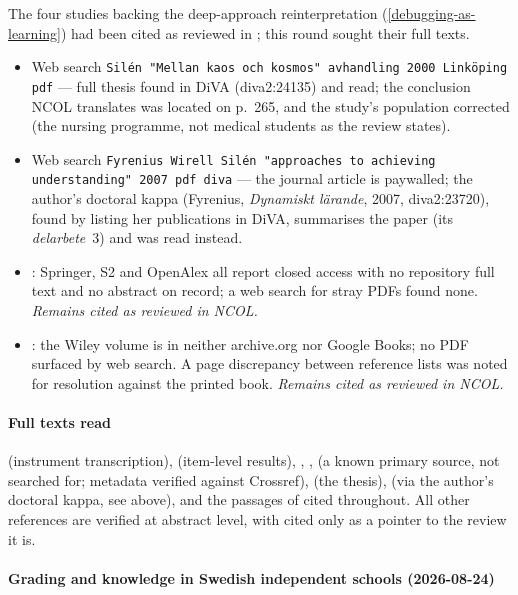 The four studies backing the deep-approach reinterpretation
(\cref{debugging-as-learning}) had been cited as reviewed in
; this round sought their full texts.
\begin{itemize}
  \item Web search \texttt{Silén "Mellan kaos och kosmos" avhandling
    2000 Linköping pdf} --- full thesis found in DiVA
    (diva2:24135) and read; the conclusion NCOL translates was
    located on p.~265, and the study's population corrected (the
    nursing programme, not medical students as the review states).
  \item Web search \texttt{Fyrenius Wirell Silén "approaches to
    achieving understanding" 2007 pdf diva} --- the journal article
    is paywalled; the author's doctoral kappa (Fyrenius,
    \emph{Dynamiskt lärande}, 2007, diva2:23720), found by listing
    her publications in DiVA, summarises the paper (its
    \emph{delarbete}~3) and was read instead.
  \item \Textcite{MartonWenWong2005}: Springer, S2 and OpenAlex all
    report closed access with no repository full text and no
    abstract on record; a web search for stray PDFs found none.
    \emph{Remains cited as reviewed in NCOL.}
  \item \Textcite{MartonWenestam1988}: the Wiley volume is in
    neither archive.org nor Google Books; no PDF surfaced by web
    search.  A page discrepancy between reference lists was noted
    for resolution against the printed book.
    \emph{Remains cited as reviewed in NCOL.}
\end{itemize}

\paragraph{Full texts read}

\Textcite{RSPQ2F} (instrument transcription),
\textcite{SCS1IRT} (item-level results),
\textcite{BruceLearningToProgram},
\textcite{NPKT},
\textcite{LiterateProgramming} (a known primary source, not searched
for; metadata verified against Crossref),
\textcite{Silen2000} (the thesis),
\textcite{FyreniusWirellSilen2007} (via the author's doctoral kappa,
see above),
and the passages of  cited throughout.
All other references are verified at abstract level, with
\textcite{DebuggingReview} cited only as a pointer to the review it is.

\paragraph{Grading and knowledge in Swedish independent schools (2026-08-24)}

